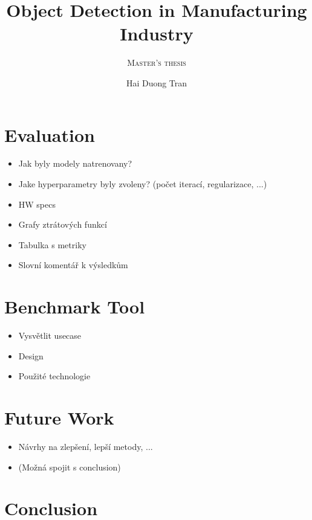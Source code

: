 \documentclass{mimosis}
\title{Object Detection in Manufacturing Industry}
\subtitle{\textsc{Master's thesis}}
\author{Hai Duong Tran}
\begin{document}
\frontmatter
%   
%   
%   
%   
  \tableofcontents

\mainmatter

    \let\cleardoublepage\clearpage
    
    
    
    
    
    
    \chapter{Evaluation}
    \begin{itemize}
    \item Jak byly modely natrenovany?
    \item Jake hyperparametry byly zvoleny? (počet iterací, regularizace, ...)
    \item HW specs
    \item Grafy ztrátových funkcí
    \item Tabulka s metriky
    \item Slovní komentář k výsledkům
    \end{itemize}
    
    \chapter{Benchmark Tool}
    \begin{itemize}
    \item Vysvětlit usecase
    \item Design 
    \item Použité technologie
    \end{itemize}
    
    \chapter{Future Work}
    \begin{itemize}
    \item Návrhy na zlepšení, lepší metody, ...
    \item (Možná spojit s conclusion)
    \end{itemize}
    
    \chapter{Conclusion}


\backmatter

  \begingroup
    \let\clearpage\relax
    \glsaddall
  \endgroup

  \printindex
  \begingroup
    \sloppy
      \printbibliography
    \endgroup
\end{document}
